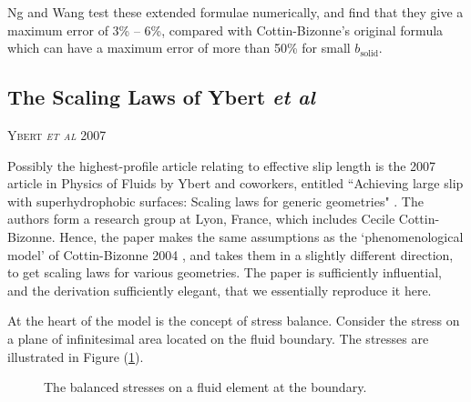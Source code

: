 \documentclass[12pt, a4paper, twoside, openright]{book}
\newcommand{\paper}[1]
         {\colorbox[gray]{0.8}{ \textsc{#1}}
         
         }
\begin{document}
Ng and Wang test these extended formulae numerically, and find that they give a maximum error of 3\% -- 6\%, compared with Cottin-Bizonne's original formula which can have a maximum error of more than 50\% for small $b_{\mathrm{solid}}$.


\subsection*{The Scaling Laws of Ybert \emph{et al}}

\paper{Ybert \emph{et al} 2007}
Possibly the highest-profile article relating to effective slip length is the 2007 article in Physics of Fluids by Ybert and coworkers, entitled ``Achieving large slip with superhydrophobic surfaces: Scaling laws for generic geometries" \cite{Ybert2007}. The authors form a research group at Lyon, France, which includes Cecile Cottin-Bizonne.  Hence, the paper makes the same assumptions as the `phenomenological model' of Cottin-Bizonne 2004 \cite{Cottin-Bizonne2004}, and takes them in a slightly different direction, to get scaling laws for various geometries.
The paper is sufficiently influential, and the derivation sufficiently elegant, that we essentially reproduce it here.

At the heart of the model is the concept of stress balance.  Consider the stress on a plane of infinitesimal area located on the fluid boundary.  The stresses are illustrated in Figure (\ref{stressbalance}).

\clearpage

\begin{figure}[ht]
\centering
{}
\caption{The balanced stresses on a fluid element at the boundary.} \label{stressbalance}
\end{figure}
\end{document}
